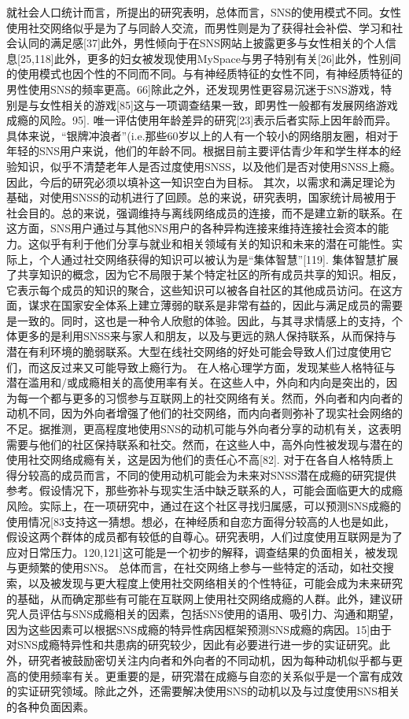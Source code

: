 就社会人口统计而言，所提出的研究表明，总体而言，SNS的使用模式不同。女性使用社交网络似乎是为了与同龄人交流，而男性则是为了获得社会补偿、学习和社会认同的满足感[37]此外，男性倾向于在SNS网站上披露更多与女性相关的个人信息[25,118]此外，更多的妇女被发现使用MySpace与男子特别有关[26]此外，性别间的使用模式也因个性的不同而不同。与有神经质特征的女性不同，有神经质特征的男性使用SNS的频率更高。66]除此之外，还发现男性更容易沉迷于SNS游戏，特别是与女性相关的游戏[85]这与一项调查结果一致，即男性一般都有发展网络游戏成瘾的风险。95].
唯一评估使用年龄差异的研究[23]表示后者实际上因年龄而异。具体来说，“银牌冲浪者”(i.e.那些60岁以上的人有一个较小的网络朋友圈，相对于年轻的SNS用户来说，他们的年龄不同。根据目前主要评估青少年和学生样本的经验知识，似乎不清楚老年人是否过度使用SNSS，以及他们是否对使用SNSS上瘾。因此，今后的研究必须以填补这一知识空白为目标。
其次，以需求和满足理论为基础，对使用SNSS的动机进行了回顾。总的来说，研究表明，国家统计局被用于社会目的。总的来说，强调维持与离线网络成员的连接，而不是建立新的联系。在这方面，SNS用户通过与其他SNS用户的各种异构连接来维持连接社会资本的能力。这似乎有利于他们分享与就业和相关领域有关的知识和未来的潜在可能性。实际上，个人通过社交网络获得的知识可以被认为是“集体智慧”[119].
集体智慧扩展了共享知识的概念，因为它不局限于某个特定社区的所有成员共享的知识。相反，它表示每个成员的知识的聚合，这些知识可以被各自社区的其他成员访问。在这方面，谋求在国家安全体系上建立薄弱的联系是非常有益的，因此与满足成员的需要是一致的。同时，这也是一种令人欣慰的体验。因此，与其寻求情感上的支持，个体更多的是利用SNSS来与家人和朋友，以及与更远的熟人保持联系，从而保持与潜在有利环境的脆弱联系。大型在线社交网络的好处可能会导致人们过度使用它们，而这反过来又可能导致上瘾行为。
在人格心理学方面，发现某些人格特征与潜在滥用和/或成瘾相关的高使用率有关。在这些人中，外向和内向是突出的，因为每一个都与更多的习惯参与互联网上的社交网络有关。然而，外向者和内向者的动机不同，因为外向者增强了他们的社交网络，而内向者则弥补了现实社会网络的不足。据推测，更高程度地使用SNS的动机可能与外向者分享的动机有关，这表明需要与他们的社区保持联系和社交。然而，在这些人中，高外向性被发现与潜在的使用社交网络成瘾有关，这是因为他们的责任心不高[82].
对于在各自人格特质上得分较高的成员而言，不同的使用动机可能会为未来对SNSS潜在成瘾的研究提供参考。假设情况下，那些弥补与现实生活中缺乏联系的人，可能会面临更大的成瘾风险。实际上，在一项研究中，通过在这个社区寻找归属感，可以预测SNS成瘾的使用情况[83支持这一猜想。想必，在神经质和自恋方面得分较高的人也是如此，假设这两个群体的成员都有较低的自尊心。研究表明，人们过度使用互联网是为了应对日常压力。120,121]这可能是一个初步的解释，调查结果的负面相关，被发现与更频繁的使用SNS。
总体而言，在社交网络上参与一些特定的活动，如社交搜索，以及被发现与更大程度上使用社交网络相关的个性特征，可能会成为未来研究的基础，从而确定那些有可能在互联网上使用社交网络成瘾的人群。此外，建议研究人员评估与SNS成瘾相关的因素，包括SNS使用的语用、吸引力、沟通和期望，因为这些因素可以根据SNS成瘾的特异性病因框架预测SNS成瘾的病因。15]由于对SNS成瘾特异性和共患病的研究较少，因此有必要进行进一步的实证研究。此外，研究者被鼓励密切关注内向者和外向者的不同动机，因为每种动机似乎都与更高的使用频率有关。更重要的是，研究潜在成瘾与自恋的关系似乎是一个富有成效的实证研究领域。除此之外，还需要解决使用SNS的动机以及与过度使用SNS相关的各种负面因素。
